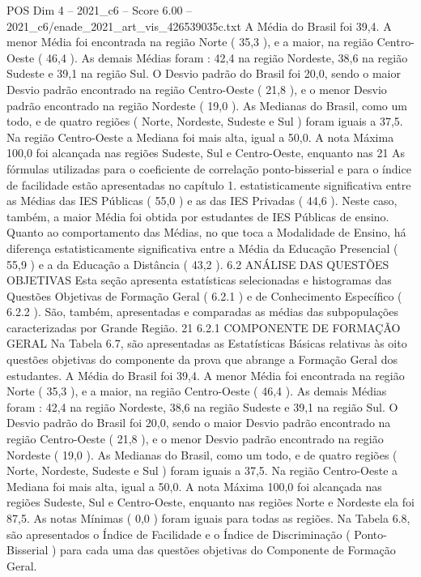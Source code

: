 \begin{textsample}{POS Dim 4 – 2021\_c6 – Score 6.00 – 2021\_c6/enade\_2021\_art\_vis\_426539035c.txt}
A Média do Brasil foi 39,4.
A menor Média foi encontrada na região Norte ( 35,3 ), e a maior, na região Centro-Oeste ( 46,4 ).
As demais Médias foram : 42,4 na região Nordeste, 38,6 na região Sudeste e 39,1 na região Sul.
O Desvio padrão do Brasil foi 20,0, sendo o maior Desvio padrão encontrado na região Centro-Oeste ( 21,8 ), e o menor Desvio padrão encontrado na região Nordeste ( 19,0 ).
As Medianas do Brasil, como um todo, e de quatro regiões ( Norte, Nordeste, Sudeste e Sul ) foram iguais a 37,5.
Na região Centro-Oeste a Mediana foi mais alta, igual a 50,0.
A nota Máxima 100,0 foi alcançada nas regiões Sudeste, Sul e Centro-Oeste, enquanto nas 21 As fórmulas utilizadas para o coeficiente de correlação ponto-bisserial e para o índice de facilidade estão apresentadas no capítulo 1. estatisticamente significativa entre as Médias das IES Públicas ( 55,0 ) e as das IES Privadas ( 44,6 ).
Neste caso, também, a maior Média foi obtida por estudantes de IES Públicas de ensino.
Quanto ao comportamento das Médias, no que toca a Modalidade de Ensino, há diferença estatisticamente significativa entre a Média da Educação Presencial ( 55,9 ) e a da Educação a Distância ( 43,2 ). 6.2 ANÁLISE DAS QUESTÕES OBJETIVAS Esta seção apresenta estatísticas selecionadas e histogramas das Questões Objetivas de Formação Geral ( 6.2.1 ) e de Conhecimento Específico ( 6.2.2 ).
São, também, apresentadas e comparadas as médias das subpopulações caracterizadas por Grande Região. 21 6.2.1 COMPONENTE DE FORMAÇÃO GERAL Na Tabela 6.7, são apresentadas as Estatísticas Básicas relativas às oito questões objetivas do componente da prova que abrange a Formação Geral dos estudantes.
A Média do Brasil foi 39,4.
A menor Média foi encontrada na região Norte ( 35,3 ), e a maior, na região Centro-Oeste ( 46,4 ).
As demais Médias foram : 42,4 na região Nordeste, 38,6 na região Sudeste e 39,1 na região Sul.
O Desvio padrão do Brasil foi 20,0, sendo o maior Desvio padrão encontrado na região Centro-Oeste ( 21,8 ), e o menor Desvio padrão encontrado na região Nordeste ( 19,0 ).
As Medianas do Brasil, como um todo, e de quatro regiões ( Norte, Nordeste, Sudeste e Sul ) foram iguais a 37,5.
Na região Centro-Oeste a Mediana foi mais alta, igual a 50,0.
A nota Máxima 100,0 foi alcançada nas regiões Sudeste, Sul e Centro-Oeste, enquanto nas regiões Norte e Nordeste ela foi 87,5.
As notas Mínimas ( 0,0 ) foram iguais para todas as regiões.
Na Tabela 6.8, são apresentados o Índice de Facilidade e o Índice de Discriminação ( Ponto-Bisserial ) para cada uma das questões objetivas do Componente de Formação Geral.

\end{textsample}
